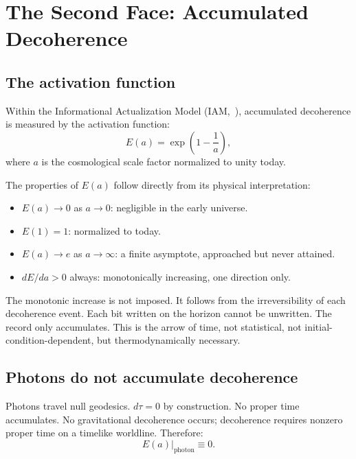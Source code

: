 \documentclass[12pt,a4paper]{article}
\begin{document}
\section{The Second Face: Accumulated Decoherence}
\label{sec:decoherence}

\subsection{The activation function}

Within the Informational Actualization Model
(IAM,~\citealt{mahaffey2026}), accumulated decoherence is measured by the
activation function:
\begin{equation}
E(a) = \exp\!\left(1 - \frac{1}{a}\right),
\label{eq:Ea}
\end{equation}
where $a$ is the cosmological scale factor normalized to unity today.

The properties of $E(a)$ follow directly from its physical interpretation:
\begin{itemize}
\item $E(a) \to 0$ as $a \to 0$: negligible in the early universe.
\item $E(1) = 1$: normalized to today.
\item $E(a) \to e$ as $a \to \infty$: a finite asymptote, approached but never
attained.
\item $dE/da > 0$ always: monotonically increasing, one direction only.
\end{itemize}

The monotonic increase is not imposed. It follows from the irreversibility
of each decoherence event. Each bit written on the horizon cannot be
unwritten. The record only accumulates. This is the arrow of time, not
statistical, not initial-condition-dependent, but thermodynamically
necessary.

\subsection{Photons do not accumulate decoherence}

Photons travel null geodesics. $d\tau = 0$ by construction. No proper time
accumulates. No gravitational decoherence occurs; decoherence requires
nonzero proper time on a timelike worldline. Therefore:
\begin{equation}
E(a)\big|_{\text{photon}} \equiv 0.
\end{equation}
\end{document}
